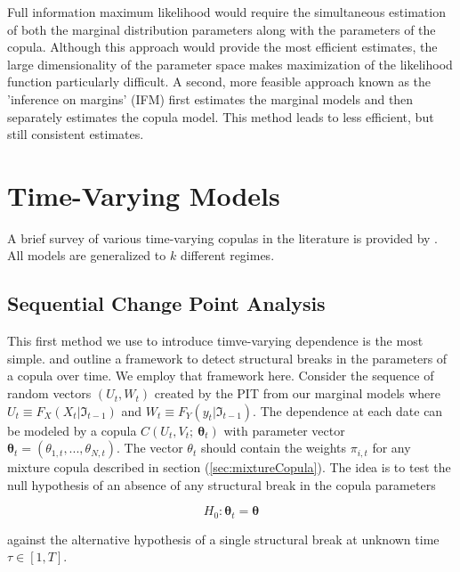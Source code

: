 \documentclass[12pt]{article}
\begin{document}
Full information maximum likelihood would require the simultaneous estimation of both the marginal distribution parameters along with the parameters of the copula. Although this approach would provide the most efficient estimates, the large dimensionality of the parameter space makes maximization of the likelihood function particularly difficult. A second, more feasible approach known as the 'inference on margins' (IFM) first estimates the marginal models and then separately estimates the copula model. This method leads to less efficient, but still consistent estimates.

\section{Time-Varying Models}

A brief survey of various time-varying copulas in the literature is provided by \cite{Manner_and_Reznikova_2012}. All models are generalized to $k$ different regimes.

\subsection{Sequential Change Point Analysis}

This first method we use to introduce timve-varying dependence is the most simple. \cite{Dias_and_Embrechts_2004} and \cite{Dias_and_Embrechts_2009} outline a framework to detect structural breaks in the parameters of a copula over time. We employ that framework here. Consider the sequence of random vectors $\left(U_{t}, W_{t}\right)$ created by the PIT from our marginal models where $U_{t}\equiv F_{X}\left(X_{t}|\Im_{t-1}\right)$ and $W_{t}\equiv F_{Y}\left(y_{t} | \Im_{t-1}\right)$. The dependence at each date can be modeled by a copula $C\left(U_{t}, V_{t};~\boldsymbol{\theta}_{t}\right)$ with parameter vector $\boldsymbol{\theta}_{t}=(\theta_{1,t},...,\theta_{N,t})$. The vector $\theta_{t}$ should contain the weights $\pi _{i,t}$ for any mixture copula described in section (\ref{sec:mixtureCopula}). The idea is to test the null hypothesis of an absence of any structural break in the copula parameters

\begin{equation}
	H_{0}:\boldsymbol{\theta}_{t} = \boldsymbol{\theta}
\end{equation}

against the alternative hypothesis of a single structural break at unknown time $\tau \in \left[1, T\right]$.
\end{document}
